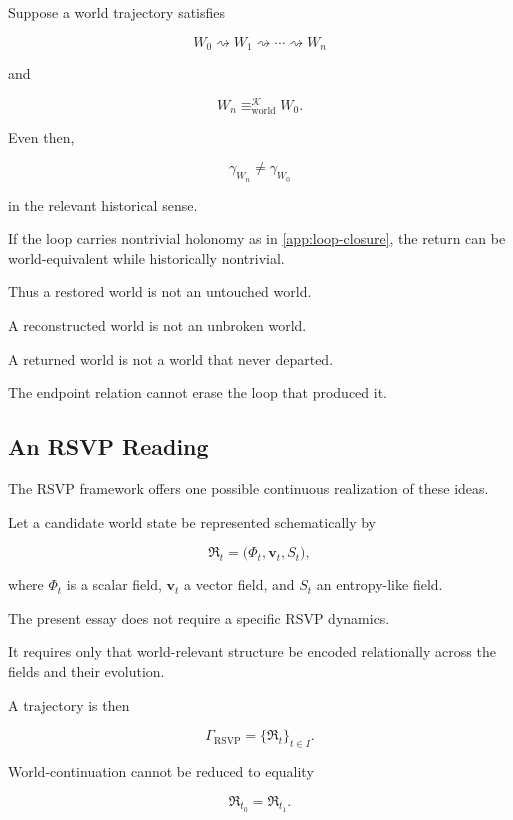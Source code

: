 \documentclass[
  11pt,
  a4paper,
  DIV=12,
  BCOR=0mm,
  parskip=half-
]{scrartcl}
\newcommand{\traj}[1]{\gamma_{#1}}
\newcommand{\eqworld}{%
  \equiv_{\mathrm{world}}%
}
\theoremstyle{definition}
\theoremstyle{plain}
\theoremstyle{remark}
\begin{document}
Suppose a world trajectory satisfies

\[
  W_0
  \rightsquigarrow
  W_1
  \rightsquigarrow
  \cdots
  \rightsquigarrow
  W_n
\]

and

\[
  W_n\eqworld^{\mathcal K}W_0.
\]

Even then,

\[
  \traj{W_n}
  \neq
  \traj{W_0}
\]

in the relevant historical sense.

If the loop carries nontrivial holonomy as in
\cref{app:loop-closure}, the return can be world-equivalent while historically
nontrivial.

Thus a restored world is not an untouched world.

A reconstructed world is not an unbroken world.

A returned world is not a world that never departed.

The endpoint relation cannot erase the loop that produced it.


\subsection{An RSVP Reading}
\label{app:rsvp-worldhood}

The RSVP framework offers one possible continuous realization of these ideas.

Let a candidate world state be represented schematically by

\[
  \mathfrak R_t
  =
  \bigl(
    \Phi_t,
    \mathbf v_t,
    S_t
  \bigr),
\]

where \(\Phi_t\) is a scalar field, \(\mathbf v_t\) a vector field, and \(S_t\)
an entropy-like field.

The present essay does not require a specific RSVP dynamics.

It requires only that world-relevant structure be encoded relationally across
the fields and their evolution.

A trajectory is then

\[
  \Gamma_{\mathrm{RSVP}}
  =
  \{
    \mathfrak R_t
  \}_{t\in I}.
\]

World-continuation cannot be reduced to equality

\[
  \mathfrak R_{t_0}
  =
  \mathfrak R_{t_1}.
\]
\end{document}

